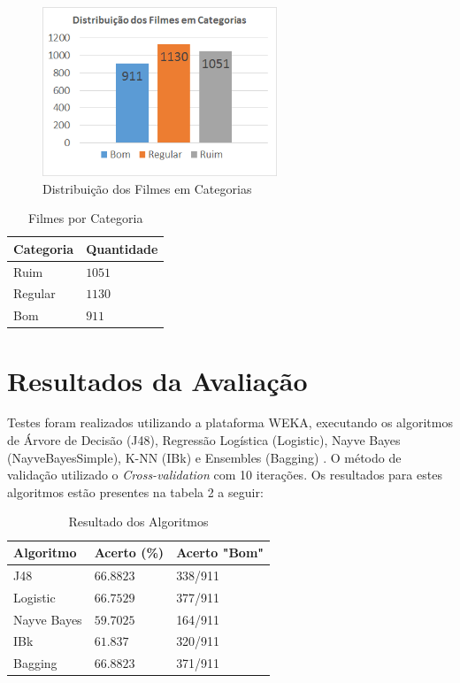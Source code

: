 \documentclass[twoside]{article}
\begin{document}
\begin{multicols}{2}
\begin{figure}[H]
\centering
\includegraphics[width=7cm]{grafico_rating.png}
\caption{Distribuição dos Filmes em Categorias}
\label{Rotulo}
\end{figure}

\begin{table}[H]
\caption{Filmes por Categoria}
\centering
\begin{tabular}{ll}
Categoria & Quantidade \\
\midrule
Ruim & $1051$ \\
Regular & $1130$ \\
Bom & $911$ \\
\bottomrule
\end{tabular}
\end{table}


\section{Resultados da Avaliação}

Testes foram realizados utilizando a plataforma WEKA, executando os algoritmos de Árvore de Decisão (J48), Regressão Logística (Logistic), Nayve Bayes (NayveBayesSimple), K-NN (IBk) e Ensembles (Bagging) . O método de validação utilizado o \textit{Cross-validation} com 10 iterações. Os resultados para estes algoritmos estão presentes na tabela 2 a seguir:

\begin{table}[H]
\caption{Resultado dos Algoritmos}
\centering
\begin{tabular}{l|ll}
Algoritmo & Acerto (\%) & Acerto "Bom"\\
\midrule
J48 & $66.8823$ & 338/911\\
Logistic & $66.7529$ & 377/911\\
Nayve Bayes & $59.7025$ & 164/911\\
IBk & $61.837$ & 320/911\\
Bagging & $66.8823$ & 371/911\\
\bottomrule
\end{tabular}
\end{table}


\end{multicols}
\end{document}
